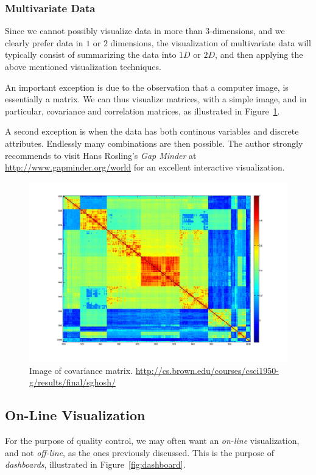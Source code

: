 \documentclass[12pt,a4paper]{report}
\theoremstyle{plain}
\theoremstyle{definition}
\begin{document}
\subsubsection{Multivariate Data}
Since we cannot possibly visualize data in more than $3$-dimensions, and we clearly prefer data in $1$ or $2$ dimensions, the visualization of multivariate data will typically consist of summarizing the data into $1D$ or $2D$, and then applying the above mentioned visualization techniques.

An important exception is due to the observation that a computer image, is essentially a matrix. 
We can thus visualize matrices, with a simple image, and in particular, covariance and correlation matrices, as illustrated in Figure~\ref{fig:covariance_image}.

A second exception is when the data has both continous variables and discrete attributes. 
Endlessly many combinations are then possible.
The author strongly recommends to visit Hans Rosling's \emph{Gap Minder} at \url{http://www.gapminder.org/world} for an excellent interactive visualization. 


\begin{figure}[h]
\centering
\includegraphics[height=0.3\textheight]{art/covarianceSupervised}
\caption[Covariance Matrix]{Image of covariance matrix. \newline
\url{http://cs.brown.edu/courses/csci1950-g/results/final/sghosh/}}
\label{fig:covariance_image}
\end{figure}




\subsection{On-Line Visualization}
For the purpose of quality control, we may often want an \emph{on-line} visualization, and not \emph{off-line}, as the ones previously discussed.
This is the purpose of \emph{dashboards}, illustrated in Figure~\ref{fig:dashboard}.
\end{document}
